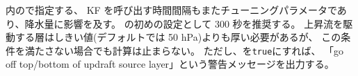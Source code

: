 内ので指定する、
KF を呼び出す時間間隔もまたチューニングパラメータであり、降水量に影響を及す。
の初めの設定として 300 秒を推奨する。
上昇流を駆動する層はしきい値(デフォルトでは 50 hPa)よりも厚い必要があるが、
この条件を満たさない場合でも計算は止まらない。
ただし、を\verb|true|にすれば、
「go off top/bottom of updraft source layer」という警告メッセージを出力する。
